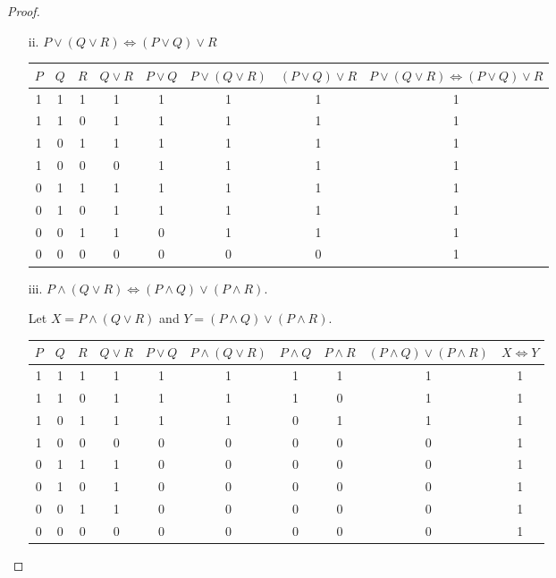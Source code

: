 \documentclass{article}
\begin{document}
\begin{enumerate}
\begin{proof}
{\begin{enumerate}
					\item[ii.] $P \lor (Q \lor R) \iff (P \lor Q) \lor R$
					
					\begin{center}
						\begin{tabular}{|c|c|c|c|c|c|c|c|}
							\hline
							$P$ & $Q$ & $R$ & $Q \lor R$ & $P \lor Q$ & $P \lor (Q \lor R)$ & $(P \lor Q) \lor R$ & $P \lor (Q \lor R) \iff (P \lor Q) \lor R$ \\
							\hline
							1 & 1 & 1 & 1 & 1 & 1 & 1 & 1 \\
							1 & 1 & 0 & 1 & 1 & 1 & 1 & 1 \\
							1 & 0 & 1 & 1 & 1 & 1 & 1 & 1 \\
							1 & 0 & 0 & 0 & 1 & 1 & 1 & 1 \\
							0 & 1 & 1 & 1 & 1 & 1 & 1 & 1 \\
							0 & 1 & 0 & 1 & 1 & 1 & 1 & 1 \\
							0 & 0 & 1 & 1 & 0 & 1 & 1 & 1 \\
							0 & 0 & 0 & 0 & 0 & 0 & 0 & 1 \\
							\hline
						\end{tabular}
					\end{center} 
					
					\item[iii.]$P \land (Q \lor R) \iff (P \land Q) \lor (P \land R)$.
					
					Let $X = P \land (Q \lor R)$ and $Y = (P \land Q) \lor (P \land R)$.
					
					\begin{center}
						\begin{tabular}{|c|c|c|c|c|c|c|c|c|c|}
							\hline
							$P$ & $Q$ & $R$ & $Q \lor R$ & $P \lor Q$ & $P \land (Q \lor R)$ & $P \land Q$ & $P \land R$ & $(P \land Q) \lor (P \land R)$ & $X \iff Y$ \\
							\hline
							1 & 1 & 1 & 1 & 1 & 1 & 1 & 1 & 1 & 1 \\
							1 & 1 & 0 & 1 & 1 & 1 & 1 & 0 & 1& 1 \\
							1 & 0 & 1 & 1 & 1 & 1 & 0 & 1 & 1 & 1 \\
							1 & 0 & 0 & 0 & 0 & 0 & 0 & 0 & 0 & 1\\
							0 & 1 & 1 & 1 & 0 & 0 & 0 & 0 & 0 &  1 \\
							0 & 1 & 0 & 1 & 0 & 0 & 0 & 0 & 0 & 1\\
							0 & 0 & 1 & 1 & 0 & 0 & 0 & 0 & 0 & 1\\
							0 & 0 & 0 & 0 & 0 & 0 & 0 & 0 & 0 &  1\\
							\hline
						\end{tabular}
					\end{center} 
					

\end{enumerate}}
\end{proof}
\end{enumerate}
\end{document}
